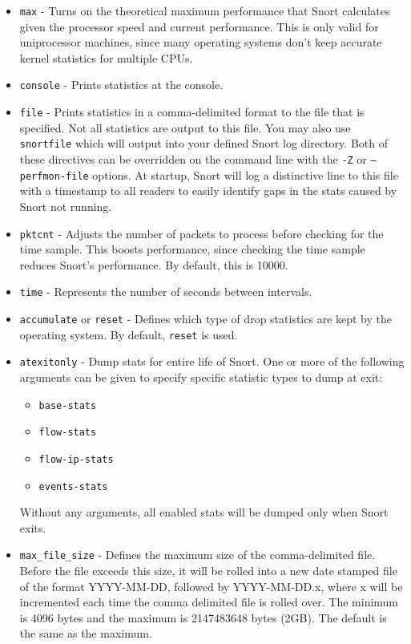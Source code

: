 \documentclass[english]{report}
\begin{document}
\begin{itemize}
\item \texttt{max} - Turns on the theoretical maximum performance that Snort
calculates given the processor speed and current performance.  This is only
valid for uniprocessor machines, since many operating systems don't keep
accurate kernel statistics for multiple CPUs.  

\item \texttt{console} - Prints statistics at the console.

\item \texttt{file} - Prints statistics in a comma-delimited format to the file
that is specified.  Not all statistics are output to this file.  You may also
use \texttt{snortfile} which will output into your defined Snort log directory.
Both of these directives can be overridden on the command line with the
\texttt{-Z} or \texttt{--perfmon-file} options.  At startup, Snort will log
a distinctive line to this file with a timestamp to all readers to easily identify
gaps in the stats caused by Snort not running.

\item \texttt{pktcnt} - Adjusts the number of packets to process before
checking for the time sample.  This boosts performance, since checking the time
sample reduces Snort's performance.  By default, this is 10000.  

\item \texttt{time} - Represents the number of seconds between intervals.

\item \texttt{accumulate} or \texttt{reset} - Defines which type of drop
statistics are kept by the operating system. By default, \texttt{reset} is
used.

\item \texttt{atexitonly} - Dump stats for entire life of Snort.
One or more of the following arguments can be given to specify specific
statistic types to dump at exit:
\begin{itemize}
\item \texttt{base-stats}
\item \texttt{flow-stats}
\item \texttt{flow-ip-stats}
\item \texttt{events-stats}
\end{itemize}
Without any arguments, all enabled stats will be dumped only when Snort exits.

\item \texttt{max\_file\_size} - Defines the maximum size of the
comma-delimited file.  Before the file exceeds this size, it will be rolled
into a new date stamped file of the format YYYY-MM-DD, followed by
YYYY-MM-DD.x, where x will be incremented each time the comma delimited file
is rolled over.  The minimum is 4096 bytes and the maximum is 2147483648 bytes
(2GB).  The default is the same as the maximum.


\end{itemize}
\end{document}
